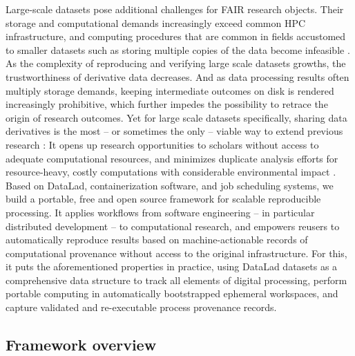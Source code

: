 Large-scale datasets pose additional challenges for \gls{FAIR} research objects.
Their storage and computational demands increasingly exceed common \gls{HPC} infrastructure, and computing procedures that are common in fields accustomed to smaller datasets such as storing multiple copies of the data become infeasible \citep{horien2021hitchhiker}.
As the complexity of reproducing and verifying large scale datasets growths, the trustworthiness of derivative data decreases.
And as data processing results often multiply storage demands, keeping intermediate outcomes on disk is rendered increasingly prohibitive, which further impedes the possibility to retrace the origin of research outcomes.
Yet for large scale datasets specifically, sharing data derivatives is the most -- or sometimes the only -- viable way to extend previous research \citep{craddock2013neuro}:
It opens up research opportunities to scholars without access to adequate computational resources, and minimizes duplicate analysis efforts for resource-heavy, costly computations with considerable environmental impact \citep{portegies2020ecological}.\\
Based on DataLad, containerization software, and job scheduling systems, we build a portable, free and open source framework for scalable reproducible processing.
It applies workflows from software engineering -- in particular distributed development -- to computational research, and empowers reusers to automatically reproduce results based on machine-actionable records of computational provenance without access to the original infrastructure.
For this, it puts the aforementioned properties in practice, using DataLad datasets as a comprehensive data structure to track all elements of digital processing, perform portable computing in automatically bootstrapped ephemeral workspaces, and capture validated and re-executable process provenance records.

\subsection{Framework overview}


